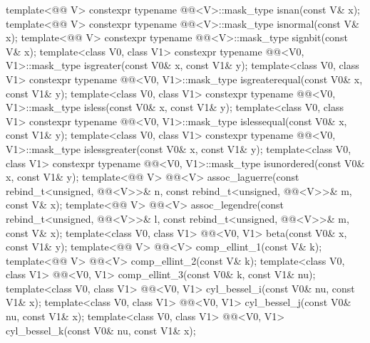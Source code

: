 \begin{codeblock}
{  template<@@ V>
    constexpr typename @@<V>::mask_type isnan(const V& x);
  template<@@ V>
    constexpr typename @@<V>::mask_type isnormal(const V& x);
  template<@@ V>
    constexpr typename @@<V>::mask_type signbit(const V& x);
  template<class V0, class V1>
    constexpr typename @@<V0, V1>::mask_type
      isgreater(const V0& x, const V1& y);
  template<class V0, class V1>
    constexpr typename @@<V0, V1>::mask_type
      isgreaterequal(const V0& x, const V1& y);
  template<class V0, class V1>
    constexpr typename @@<V0, V1>::mask_type
      isless(const V0& x, const V1& y);
  template<class V0, class V1>
    constexpr typename @@<V0, V1>::mask_type
      islessequal(const V0& x, const V1& y);
  template<class V0, class V1>
    constexpr typename @@<V0, V1>::mask_type
      islessgreater(const V0& x, const V1& y);
  template<class V0, class V1>
    constexpr typename @@<V0, V1>::mask_type
      isunordered(const V0& x, const V1& y);
  template<@@ V>
    @@<V> assoc_laguerre(const rebind_t<unsigned, @@<V>>& n,
                                    const rebind_t<unsigned, @@<V>>& m, const V& x);
  template<@@ V>
    @@<V> assoc_legendre(const rebind_t<unsigned, @@<V>>& l,
                                    const rebind_t<unsigned, @@<V>>& m, const V& x);
  template<class V0, class V1>
    @@<V0, V1> beta(const V0& x, const V1& y);
  template<@@ V> @@<V> comp_ellint_1(const V& k);
  template<@@ V> @@<V> comp_ellint_2(const V& k);
  template<class V0, class V1>
    @@<V0, V1> comp_ellint_3(const V0& k, const V1& nu);
  template<class V0, class V1>
    @@<V0, V1> cyl_bessel_i(const V0& nu, const V1& x);
  template<class V0, class V1>
    @@<V0, V1> cyl_bessel_j(const V0& nu, const V1& x);
  template<class V0, class V1>
    @@<V0, V1> cyl_bessel_k(const V0& nu, const V1& x);
}
\end{codeblock}
